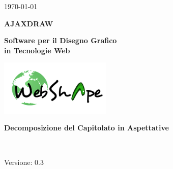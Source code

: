\usepackage{multirow}


\renewcommand{\insertversion}{0.3} %
\renewcommand{\TITOLODOC}{Decomposizione del Capitolato in Aspettative} %

\begin{titlepage}
\begin{center}
	\begin{Large}	\today \end{Large}
\end{center}

\vspace{20pt}

\begin{center}
	\begin{Huge}
				\textbf{AJAXDRAW}
	\end{Huge}
\end{center}			

\begin{center}
	\begin{large}
				\textbf{Software per il Disegno Grafico\\ in Tecnologie Web}
	\end{large}
\end{center}			

\vspace{20pt}

\begin{center}
\includegraphics[width=150pt]{logo}
\end{center}

\vspace{160pt}
\begin{center} %
	\begin{Huge}
				\textbf{\TITOLODOC}
	\end{Huge}
			\\
\end{center}
\vspace{100pt}
\begin{center}
Versione: \insertversion
\end{center}
\end{titlepage}

